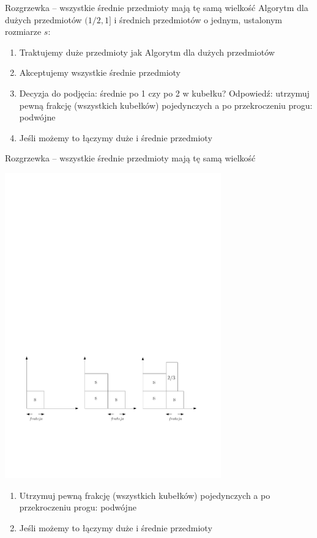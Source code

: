 \documentclass{beamer}
\begin{document}
\begin{frame}{Rozgrzewka -- wszystkie średnie przedmioty mają tę samą wielkość}
  Algorytm dla dużych przedmiotów $(1/2, 1]$ i średnich przedmiotów o jednym, ustalonym rozmiarze $s$:
  
  \begin{enumerate}
    \item Traktujemy duże przedmioty jak Algorytm dla dużych przedmiotów
    \item Akceptujemy wszystkie średnie przedmioty
    \item Decyzja do podjęcia: średnie po 1 czy po 2 w kubełku? Odpowiedź: utrzymuj pewną frakcję (wszystkich kubełków) pojedynczych a po przekroczeniu progu: podwójne
    \item Jeśli możemy to łączymy duże i średnie przedmioty
  \end{enumerate}
\end{frame}


\begin{frame}{Rozgrzewka -- wszystkie średnie przedmioty mają tę samą wielkość}

  \begin{center}
    \includegraphics[width=0.7\textwidth]{figs/fraction.pdf}
  \end{center}
  
  \begin{enumerate}
    \item Utrzymuj pewną frakcję (wszystkich kubełków) pojedynczych a po przekroczeniu progu: podwójne
    \item Jeśli możemy to łączymy duże i średnie przedmioty
  \end{enumerate}
\end{frame}
\end{document}

